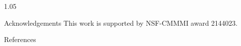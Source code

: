 \documentclass[final]{beamer}
\newlength{\sepwidth}
\newlength{\colwidth}
\newcommand{\separatorcolumn}{\begin{column}{\sepwidth}\end{column}}
\begin{document}
\begin{frame}[t]
\begin{columns}[t]
\begin{column}{1.05\colwidth}
\begin{center}
      \end{center}
      \vspace{0.5cm}
      \begin{block}{Acknowledgements}
        This work is supported by NSF-CMMMI award 2144023.
      \end{block}
      \vspace{-0.7cm}
      \begin{block}{References}
        \printbibliography

      \end{block}

      
    \end{column}

    \separatorcolumn
  \end{columns}
\end{frame}
\end{document}
